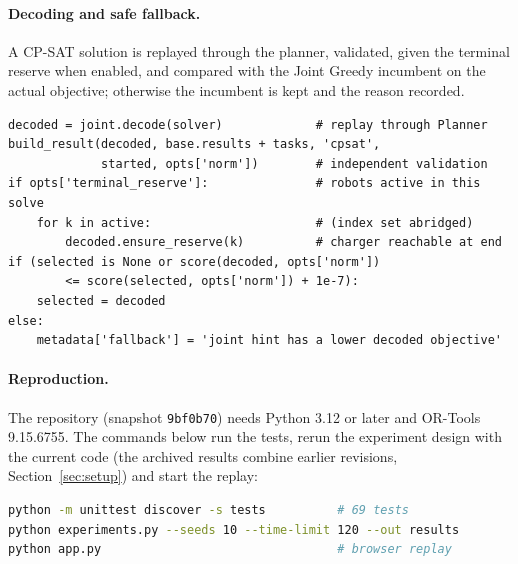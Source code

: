 \documentclass[11pt,a4paper]{article}
\newcommand{\code}[1]{\texttt{#1}}
\begin{document}
\paragraph{Decoding and safe fallback.} A CP-SAT solution is replayed through the planner, validated,
given the terminal reserve when enabled, and compared with the Joint Greedy incumbent on the actual
objective; otherwise the incumbent is kept and
the reason recorded.
\begin{lstlisting}
decoded = joint.decode(solver)             # replay through Planner
build_result(decoded, base.results + tasks, 'cpsat',
             started, opts['norm'])        # independent validation
if opts['terminal_reserve']:               # robots active in this solve
    for k in active:                       # (index set abridged)
        decoded.ensure_reserve(k)          # charger reachable at end
if (selected is None or score(decoded, opts['norm'])
        <= score(selected, opts['norm']) + 1e-7):
    selected = decoded
else:
    metadata['fallback'] = 'joint hint has a lower decoded objective'
\end{lstlisting}

\paragraph{Reproduction.} The repository (snapshot \code{9bf0b70}) needs Python 3.12 or later and
OR-Tools 9.15.6755. The commands below run the tests, rerun the experiment design with the current code (the archived
results combine earlier revisions, Section~\ref{sec:setup}) and start the replay:
\begin{lstlisting}[language=bash]
python -m unittest discover -s tests          # 69 tests
python experiments.py --seeds 10 --time-limit 120 --out results
python app.py                                 # browser replay
\end{lstlisting}
\end{document}
